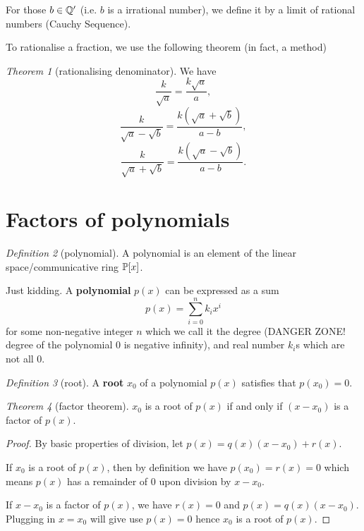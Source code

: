 \documentclass[8pt]{article}
\theoremstyle{remark}
\newtheorem{theorem}{Theorem}[section]
\newtheorem{definition}[theorem]{Definition}
\begin{document}
        For those $b \in \mathbb{Q}'$ (i.e. $b$ is a irrational number), we define it by a limit of rational numbers (Cauchy Sequence).

        To rationalise a fraction, we use the following theorem (in fact, a method)
        
        \begin{theorem}[rationalising denominator]
            We have
            $$
                \frac{k}{\sqrt{a}} = \frac{k \sqrt{a}}{a},
            $$
            $$
                \frac{k}{\sqrt{a} - \sqrt{b}} = \frac{k(\sqrt{a} + \sqrt{b})}{a - b},
            $$
            $$
                \frac{k}{\sqrt{a} + \sqrt{b}} = \frac{k(\sqrt{a} - \sqrt{b})}{a - b}.
            $$
        \end{theorem}

    \section{Factors of polynomials}
        \begin{definition}[polynomial]
            A polynomial is an element of the linear space/communicative ring $\mathbb{P} [x]$.

            Just kidding. A \textbf{polynomial} $p(x)$ can be expressed as a sum
            $$
                p(x) = \sum_{i = 0}^{n} k_i x^i
            $$
            for some non-negative integer $n$ which we call it the degree (DANGER ZONE! degree of the polynomial 0 is negative infinity), and real number $k_i$s which are not all 0. 
        \end{definition}

        \begin{definition}[root]
            A \textbf{root} $x_0$ of a polynomial $p(x)$ satisfies that $p(x_0) = 0$.
        \end{definition}

        \begin{theorem}[factor theorem]
            $x_0$ is a root of $p(x)$ if and only if $(x - x_0)$ is a factor of $p(x)$.

            \begin{proof}
                By basic properties of division, let $p(x) = q(x) (x - x_0) + r(x)$.

                If $x_0$ is a root of $p(x)$, then by definition we have $p(x_0) = r(x) = 0$ which means $p(x)$ has a remainder of $0$ upon division by $x - x_0$.
                
                If $x - x_0$ is a factor of $p(x)$, we have $r(x) = 0$ and $p(x) = q(x) (x - x_0)$. Plugging in $x = x_0$ will give use $p(x) = 0$ hence $x_0$ is a root of $p(x)$.
            \end{proof}
        \end{theorem}
\end{document}
